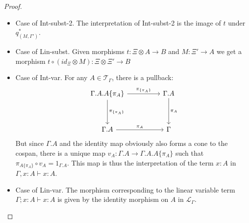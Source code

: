 \begin{thm}[Soundness]
\begin{proof}
\begin{itemize}
\item Case of Int-subst-2. The interpretation of Int-subst-2 is the image of $t$ under $q_{(M, \Gamma')}^*$.
\item Case of Lin-subst. Given morphisms $t : \Xi \otimes A \to B$ and $M : \Xi' \to A$ we get a morphism $t \circ (id_\Xi \otimes M) : \Xi \otimes \Xi' \to B$
\item Case of Int-var. For any $A \in \mathcal{T}_\Gamma$, there is a pullback:
  \[
    \ti
    \Gamma.A.A\{\pi_A\} \ar[r, "\pi_{\{\pi_A\}}"] \ar[d, "\pi_{\{\pi_A\}}"] & \Gamma.A \ar[d, "\pi_A"]\\
    \Gamma.A \ar[r, "\pi_A"] & \Gamma
    \kz
  \]
  But since $\Gamma.A$ and the identity map obviously also forms a cone to the cospan, there is a unique map $v_A : \Gamma.A \to \Gamma.A.A\{\pi_A\}$ such that $\pi_{A\{\pi_A\}} \circ v_A = 1_{\Gamma.A}$. This map is thus the interpretation of the term $x : A$ in $\Gamma, x : A \vdash x : A$.
\item Case of Lin-var. The morphism corresponding to the linear variable term $\Gamma; x : A \vdash x : A$ is given by the identity morphism on $A$ in $\mathcal{L}_{\Gamma}$.
\end{itemize}
\end{proof}
\end{thm}
